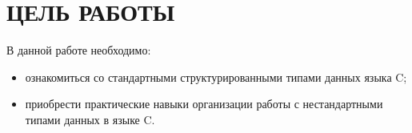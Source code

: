 \section{ЦЕЛЬ РАБОТЫ}

В данной работе необходимо:

\begin{itemize}
  \item ознакомиться со стандартными структурированными типами данных языка C;
  \item приобрести практические навыки организации работы с нестандартными типами данных в языке C.
\end{itemize}

\newpage